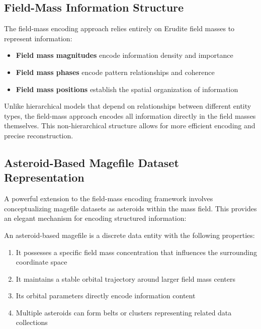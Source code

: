 \subsection{Field-Mass Information Structure}

The field-mass encoding approach relies entirely on Erudite field masses to represent information:

\begin{itemize}
    \item \textbf{Field mass magnitudes} encode information density and importance
    \item \textbf{Field mass phases} encode pattern relationships and coherence
    \item \textbf{Field mass positions} establish the spatial organization of information
\end{itemize}

Unlike hierarchical models that depend on relationships between different entity types, the field-mass approach encodes all information directly in the field masses themselves. This non-hierarchical structure allows for more efficient encoding and precise reconstruction.

\subsection{Asteroid-Based Magefile Dataset Representation}

A powerful extension to the field-mass encoding framework involves conceptualizing magefile datasets as asteroids within the mass field. This provides an elegant mechanism for encoding structured information:

\begin{definition}
An asteroid-based magefile is a discrete data entity with the following properties:
\begin{enumerate}
    \item It possesses a specific field mass concentration that influences the surrounding coordinate space
    \item It maintains a stable orbital trajectory around larger field mass centers
    \item Its orbital parameters directly encode information content
    \item Multiple asteroids can form belts or clusters representing related data collections
\end{enumerate}
\end{definition}

